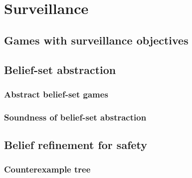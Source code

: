 
\chapter{Surveillance}




% 


\section{Games with surveillance objectives}\label{sec:gamedef}

%
%
\section{Belief-set abstraction}
\subsection{Abstract belief-set games}

%
\subsection{Soundness of belief-set abstraction}

%
%
%
\section{Belief refinement for safety}%

\subsection{Counterexample tree}

